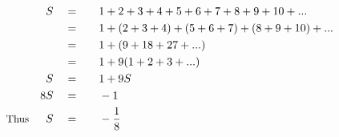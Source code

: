 \begin{alignat*}{5}
&\,&S\quad&=\quad&&1+2+3+4+5+6+7+8+9+10+...\\
&\,&\,&=&&1+(2+3+4)+(5+6+7)+(8+9+10)+...\\
&\,&\,&=&&1+(9+18+27+...)\\
&\,&\,&=&&1+9(1+2+3+...)\\
&\,&S\quad&=&&1+9S\\
&\,&8S\quad&=&&-1\\
&\small\text{Thus}&S\quad&=&&-\frac{1}{8}
\end{alignat*}
